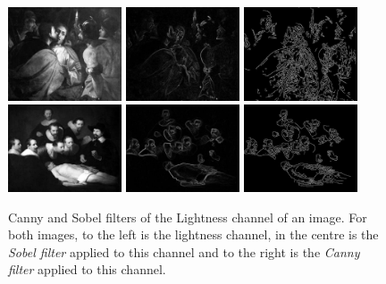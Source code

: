 \documentclass[11pt,a4paper,draft]{report}
\begin{document}
\begin{multicols}{2}
\begin{figure}[tbp]
\centering
\includegraphics[width=0.30\textwidth]{L_caravaggio_1962_139_1}
\includegraphics[width=0.30\textwidth]{sobel_L_caravaggio_1962_139_1}
\includegraphics[width=0.30\textwidth]{canny_L_caravaggio_1962_139_1}
\includegraphics[width=0.30\textwidth]{L_rembrandt_eu_464}
\includegraphics[width=0.30\textwidth]{sobel_L_rembrandt_eu_464}
\includegraphics[width=0.30\textwidth]{canny_L_rembrandt_eu_464}
\caption[Canny and Sobel filters of Lightness]{Canny and Sobel filters of the
Lightness channel of an image.  For both images, to the left is the lightness
channel, in the centre is the \emph{Sobel filter} applied to this channel and
to the right is the \emph{Canny filter} applied to this channel.}
\label{fig:cannysobell}
\end{figure}


\end{multicols}
\end{document}
